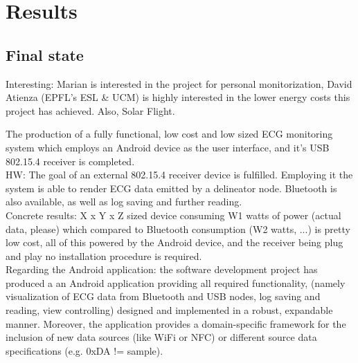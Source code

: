 \chapter{Results}
\label{cha:results}

	\section{Final state}
	\label{sec:end-state}
	
		Interesting: Marian is interested in the project for personal monitorization, David Atienza (EPFL's ESL \& UCM) is highly interested in the lower energy costs this project has achieved. Also, Solar Flight.

		The production of a fully functional, low cost and low sized ECG monitoring system which employs an Android device as the user interface, and it's USB 802.15.4 receiver is completed.\\

		HW: The goal of an external 802.15.4 receiver device is fulfilled. Employing it the system is able to render ECG data emitted by a delineator node. Bluetooth is also available, as well as log saving and further reading.\\

		Concrete results: X x Y x Z sized device consuming W1 watts of power (actual data, please) which compared to Bluetooth consumption (W2 watts, ...) is pretty low cost, all of this powered by the Android device, and the receiver being plug and play no installation procedure is required.\\

		Regarding the Android application: the software development project has produced a an Android application providing all required functionality, (namely visualization of ECG data from Bluetooth and USB nodes, log saving and reading, view controlling) designed and implemented in a robust, expandable manner. Moreover, the application provides a domain-specific framework for the inclusion of new data sources (like WiFi or NFC) or different source data specifications (e.g. 0xDA != sample).

